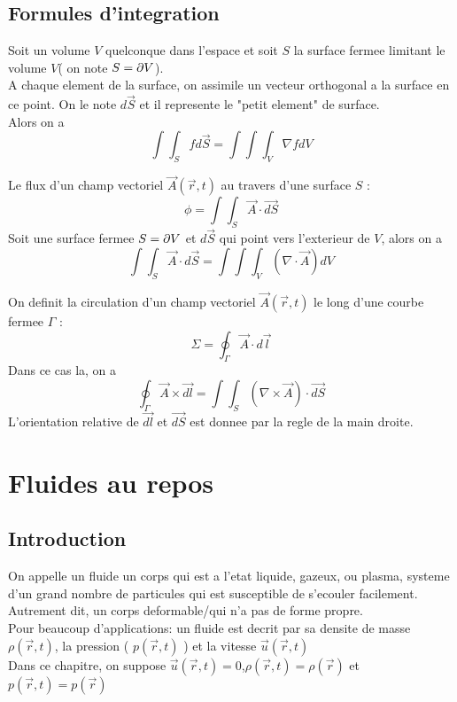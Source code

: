 \documentclass[../main.tex]{subfiles}
\begin{document}
\subsection{Formules d'integration}
\begin{thm}\label{thm:Theoreme du gradienttheoreme_du_gradient}
	Soit un volume $V$ quelconque dans l'espace et soit $S$ la surface fermee limitant le volume $V$( on note $S= \partial V$).\\
	A chaque element de la surface, on assimile un vecteur orthogonal a la surface en ce point. On le note $d \vec{S}$ et il represente le "petit element" de surface.\\
	Alors on a
	\[ 
	\int \int_S f d \vec{S} = \int \int \int_V \nabla f dV
	\]
	
\end{thm}
	
\begin{thm}\label{thm:Theoreme de La divergence( de Gauss) theoreme_de_la_divergence_de_gauss_}
	Le flux d'un champ vectoriel $\vec{A}( \vec{r},t) $ au travers d'une surface $S$ :
	\[ 
	\phi = \int \int_S \vec{A} \cdot \vec{dS}
	\]
	Soit une surface fermee $S= \partial V$ et $d \vec{S}$ qui point vers l'exterieur de $V$, alors on a
	\[ 
		\int \int _S \vec{A} \cdot d \vec{S} = \int \int \int _V ( \nabla \cdot \vec{A}) dV
	\]
	
	
\end{thm}
\begin{thm}\label{thm:Theoreme de Stokestheoreme_de_stokes}
	On definit la circulation d'un champ vectoriel $\vec{A}( \vec{r},t) $ le long d'une courbe fermee $\Gamma$ :
\[ 
\Sigma = \oint_\Gamma \vec{A} \cdot d \vec{l}
\]
Dans ce cas la, on a
\[ 
	\oint_\Gamma \vec{A} \times \vec{dl} = \int \int_S ( \nabla \times \vec{A}) \cdot \vec{dS}
\]
L'orientation relative de $\vec{dl}$ et $\vec{dS}$ est donnee par la regle de la main droite.


\end{thm}
\section{Fluides au repos}
\subsection{Introduction}
On appelle un fluide un corps qui est a l'etat liquide, gazeux, ou plasma, systeme d'un grand nombre de particules qui est susceptible de s'ecouler facilement.\\
Autrement dit, un corps deformable/qui n'a pas de forme propre.\\
Pour beaucoup d'applications: un fluide est decrit par sa densite de masse $\rho( \vec{r},t) $, la pression ( $p( \vec{r},t)$ ) et la vitesse $\vec{u}( \vec{r},t) $ \\
Dans ce chapitre, on suppose $\vec{u}( \vec{r},t) =0$,$\rho( \vec{r},t ) = \rho( \vec{r}) $ et $p( \vec{r},t) = p( \vec{r}) $ \\
\end{document}
